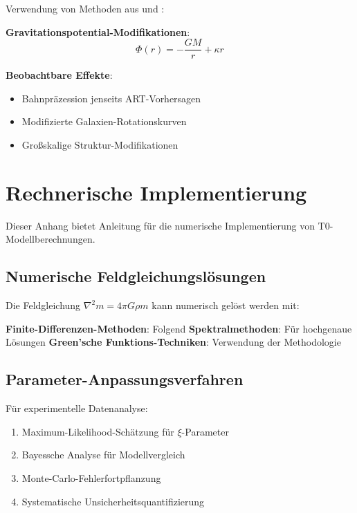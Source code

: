 \documentclass[12pt,a4paper]{article}
\begin{document}
	Verwendung von Methoden aus \citet{will2014} und \citet{binney2008}:
	
	\textbf{Gravitationspotential-Modifikationen}:
	\begin{equation}
		\Phi(r) = -\frac{GM}{r} + \kappa r
	\end{equation}
	
	\textbf{Beobachtbare Effekte}:
	\begin{itemize}
		\item Bahnpräzession jenseits ART-Vorhersagen
		\item Modifizierte Galaxien-Rotationskurven
		\item Großskalige Struktur-Modifikationen
	\end{itemize}
	
	\section{Rechnerische Implementierung}
	\label{app:computational}
	
	Dieser Anhang bietet Anleitung für die numerische Implementierung von T0-Modellberechnungen.
	
	\subsection{Numerische Feldgleichungslösungen}
	\label{app:numerical_solutions}
	
	Die Feldgleichung $\nabla^2 m = 4\pi G \rho m$ kann numerisch gelöst werden mit:
	
	\textbf{Finite-Differenzen-Methoden}: Folgend \citet{haberman2004}
	\textbf{Spektralmethoden}: Für hochgenaue Lösungen
	\textbf{Green'sche Funktions-Techniken}: Verwendung der \citet{duffy2001} Methodologie
	
	\subsection{Parameter-Anpassungsverfahren}
	\label{app:parameter_fitting}
	
	Für experimentelle Datenanalyse:
	\begin{enumerate}
		\item Maximum-Likelihood-Schätzung für $\xi$-Parameter
		\item Bayessche Analyse für Modellvergleich
		\item Monte-Carlo-Fehlerfortpflanzung
		\item Systematische Unsicherheitsquantifizierung
	\end{enumerate}
	
\end{document}

